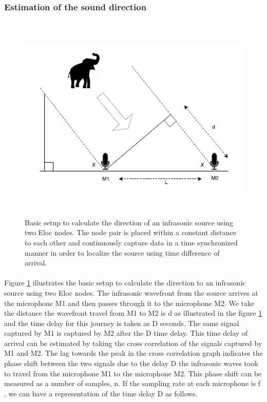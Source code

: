 \documentclass[12pt]{article}
\numberwithin{figure}{section}
\numberwithin{table}{section}
\begin{document}
\subsubsection{Estimation of the sound direction}

\begin{figure}[H]
\centering
\includegraphics[width=140mm,height=100mm]{direction.png}
\caption[Localization scenario]{Basic setup to calculate the direction of an infrasonic
source using two Eloc nodes. The node pair is placed
within a constant distance to each other and continuously
capture data in a time synchronized manner in order to localize
the source using time difference of arrival.}
\label{direction}
\end{figure}

\paragraph{}
Figure \ref{direction} illustrates the basic setup to calculate the direction to an infrasonic source using two Eloc nodes. The infrasonic wavefront from the source arrives at the microphone M1 and then passes through it to the microphone M2. We take the distance the wavefront travel from M1 to M2 is d as illustrated in the figure \ref{direction} and the time delay for this journey is taken as D seconds. The same signal captured by M1 is captured by M2 after the D time delay. This time delay of arrival can be estimated by taking the cross correlation of the signals captured by M1 and M2. The lag towards the peak in the cross correlation graph indicates the phase shift between the two signals due to the delay D the infrasonic waves took to travel from the microphone M1 to the microphone M2. This phase shift can be measured as a number of samples, n. If the sampling rate at each microphone is f , we can have a representation of the time delay D as follows. 
\end{document}

